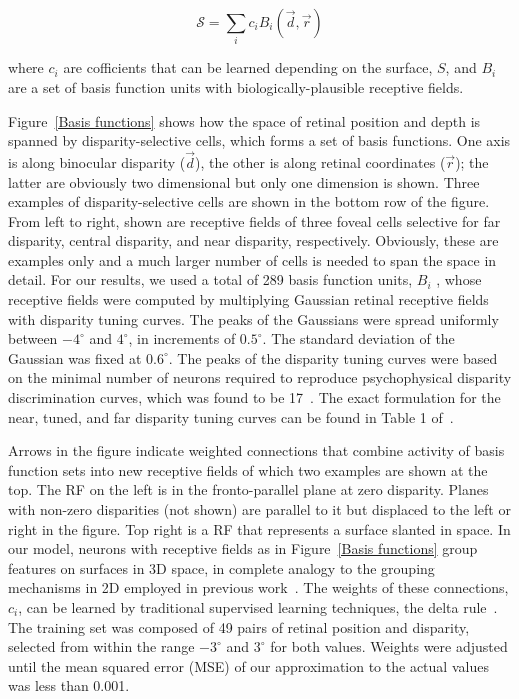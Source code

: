 \begin{equation}
\mathcal{S} = \sum_{i}c_{i}B_{i}(\vec{d}, \vec{r})
\end{equation}

\noindent where $c_{i}$ are cofficients that can be learned depending on the surface, $S$, and $B_{i}$ are a set of basis function units with biologically-plausible receptive fields.

Figure~\ref{Basis functions}
%
%
shows how the space of retinal position and depth is spanned by disparity-selective cells, which forms a set of basis functions. One axis is along binocular disparity ($\vec{d}$), the other is along retinal coordinates ($\vec{r}$); the latter are obviously two dimensional but only one dimension is shown. Three examples of disparity-selective cells are shown in the bottom row of the figure. From left to right, shown are receptive fields of three foveal cells selective for far disparity, central disparity, and near disparity, respectively. Obviously, these are examples only and a much larger number of cells is needed to span the space in detail. For our results, we used a total of 289 basis function units, $B_{i}$ , whose receptive fields were computed by multiplying Gaussian retinal receptive fields with disparity tuning curves. The peaks of the Gaussians were spread uniformly between $-4^{\circ}$ and $4^{\circ}$, in increments of $0.5^{\circ}$. The standard deviation of the Gaussian was fixed at $0.6^{\circ}$. The peaks of the disparity tuning curves were based on the minimal number of neurons required to reproduce psychophysical disparity discrimination curves, which was found to be 17~\citep{Lehky_Sejnowski90}. The exact formulation for the near, tuned, and far disparity tuning curves can be found in Table 1 of~\citet{Lehky_Sejnowski90}.

Arrows in the figure indicate weighted connections that combine activity of basis function sets into new receptive fields of which two examples are shown at the top. The RF on the left is in the fronto-parallel plane at zero disparity. Planes with non-zero disparities (not shown) are parallel to it but displaced to the left or right in the figure. Top right is a RF that represents a surface slanted in space. In our model, neurons with receptive fields as in Figure~\ref{Basis functions} group features on surfaces in 3D space, in complete analogy to the grouping mechanisms in 2D employed in previous work~\citep{Craft_etal07,Mihalas_etal11b}. The weights of these connections, $c_{i}$, can be learned by traditional supervised learning techniques, \eg the delta rule~\citep{Widrow_Hoff60}. The training set was composed of 49 pairs of retinal position and disparity, selected from within the range $-3^\circ{}$ and $3^\circ{}$ for both values. Weights were adjusted until the mean squared error (MSE) of our approximation to the actual values was less than 0.001.

